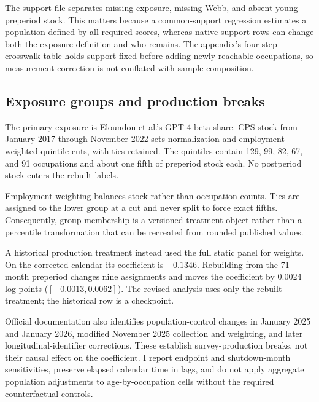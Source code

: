The support file separates missing exposure, missing Webb, and absent young preperiod stock.  This matters because a common-support regression estimates a population defined by all required scores, whereas native-support rows can change both the exposure definition and who remains.  The appendix's four-step crosswalk table holds support fixed before adding newly reachable occupations, so measurement correction is not conflated with sample composition.

\subsection{Exposure groups and production breaks}

The primary exposure is Eloundou et al.'s GPT-4 beta share.  CPS stock from January 2017 through November 2022 sets normalization and employment-weighted quintile cuts, with ties retained.  The quintiles contain 129, 99, 82, 67, and 91 occupations and about one fifth of preperiod stock each.  No postperiod stock enters the rebuilt labels.

Employment weighting balances stock rather than occupation counts.  Ties are assigned to the lower group at a cut and never split to force exact fifths.  Consequently, group membership is a versioned treatment object rather than a percentile transformation that can be recreated from rounded published values.

A historical production treatment instead used the full static panel for weights.  On the corrected calendar its coefficient is $-0.1346$.  Rebuilding from the 71-month preperiod changes nine assignments and moves the coefficient by 0.0024 log points ($[-0.0013,0.0062]$).  The revised analysis uses only the rebuilt treatment; the historical row is a checkpoint.

Official documentation also identifies population-control changes in January 2025 and January 2026, modified November 2025 collection and weighting, and later longitudinal-identifier corrections.  These establish survey-production breaks, not their causal effect on the coefficient.  I report endpoint and shutdown-month sensitivities, preserve elapsed calendar time in lags, and do not apply aggregate population adjustments to age-by-occupation cells without the required counterfactual controls.
